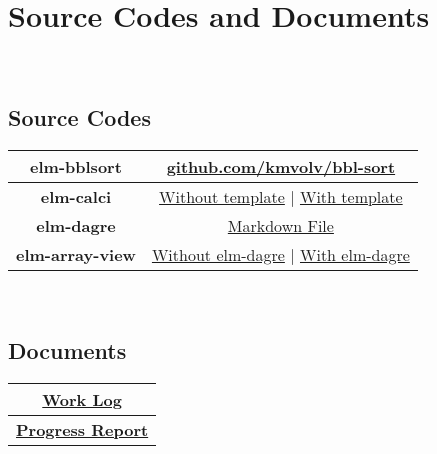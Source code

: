\cleardoublepage

\section{Source Codes and Documents}
\\[1in]

\begin{FlushLeft}
    \subsection{Source Codes}
\end{FlushLeft}

\begin{center}
    \begin{tabular}{|c|c|}
        \hline
        \textbf{elm-bblsort} & \href{https://github.com/kmvolv/bbl-sort}{github.com/kmvolv/bbl-sort} \\
        \hline
        \textbf{elm-calci} & \href{https://github.com/kmvolv/elm-calculator}{Without template} | \href{https://gitlab.com/kmvolv/elm-calc}{With template}\\
        \hline
        \textbf{elm-dagre} & \href{https://github.com/kmvolv/elm-dagre-task/blob/main/task.md}{Markdown File}\\
        \hline
        \textbf{elm-array-view} & \href{https://github.com/kmvolv/elm-arr-viz}{Without elm-dagre} | \href{https://gitlab.com/kmvolv/dagre-to-other-views}{With elm-dagre}\\
        \hline
    \end{tabular}
\end{center}
\\[1in]
\begin{FlushLeft}
    \subsection{Documents}
\end{FlushLeft}

\begin{center}
    \begin{tabular}{|c|}
        \hline
        \href{https://docs.google.com/document/d/15H3l7pcFWvjWISPDTGWta2KrMqCuAbR8mNrKf0nTY1A/edit?usp=sharing}{\textbf{Work Log}} \\
        \hline
        \href{https://docs.google.com/presentation/d/1QzPX3igU1O0PLCm7L6gVdFvYFq2oB1DSWwOMTebCt8k/edit#slide=id.g1379284fb52_0_0}{\textbf{Progress Report}}\\
        \hline
    \end{tabular}
\end{center}